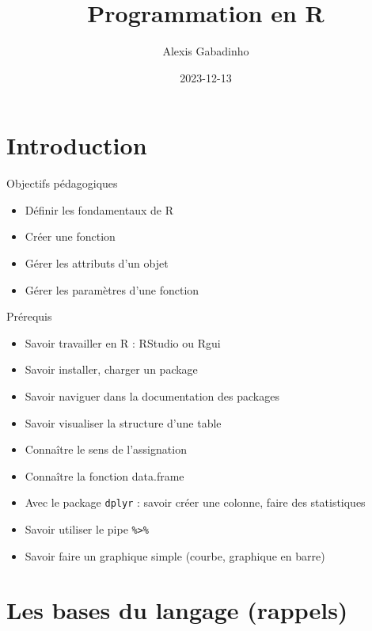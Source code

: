 \documentclass[
  ignorenonframetext,
]{beamer}
\title{Programmation en R}
\author{Alexis Gabadinho}
\date{2023-12-13}
\providecommand{\tightlist}{%
  \setlength{\itemsep}{0pt}\setlength{\parskip}{0pt}}
\begin{document}
\frame{\titlepage}

\begin{frame}[allowframebreaks]
  \tableofcontents[hideallsubsections]
\end{frame}
\hypertarget{introduction}{%
\section{Introduction}\label{introduction}}

\begin{frame}{Objectifs pédagogiques}
\protect\hypertarget{objectifs-puxe9dagogiques}{}
\begin{itemize}
\tightlist
\item
  Déﬁnir les fondamentaux de R
\item
  Créer une fonction
\item
  Gérer les attributs d'un objet
\item
  Gérer les paramètres d'une fonction
\end{itemize}
\end{frame}

\begin{frame}[fragile]{Prérequis}
\protect\hypertarget{pruxe9requis}{}
\begin{itemize}
\tightlist
\item
  Savoir travailler en R : RStudio ou Rgui
\item
  Savoir installer, charger un package
\item
  Savoir naviguer dans la documentation des packages
\item
  Savoir visualiser la structure d'une table
\item
  Connaître le sens de l'assignation
\item
  Connaître la fonction data.frame
\item
  Avec le package \texttt{dplyr} : savoir créer une colonne, faire des
  statistiques
\item
  Savoir utiliser le pipe \texttt{\%\textgreater{}\%}
\item
  Savoir faire un graphique simple (courbe, graphique en barre)
\end{itemize}
\end{frame}

\hypertarget{les-bases-du-langage-rappels}{%
\section{Les bases du langage
(rappels)}\label{les-bases-du-langage-rappels}}
\end{document}

